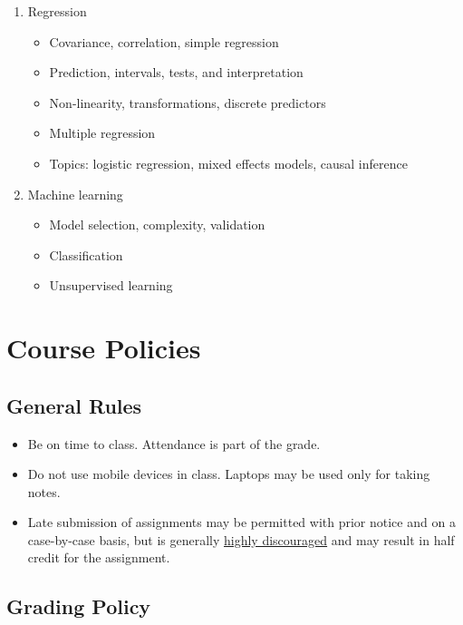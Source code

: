 \documentclass[11pt]{article}
\begin{document}
\begin{enumerate}
\item Regression

  \begin{itemize}
  \item Covariance, correlation, simple regression
  \item Prediction, intervals, tests, and interpretation
  \item Non-linearity, transformations, discrete predictors
  \item Multiple regression
  \item Topics: logistic regression, mixed effects models, causal inference
  \end{itemize}

\item Machine learning

  \begin{itemize}
  \item Model selection, complexity, validation
  \item Classification
  \item Unsupervised learning
  \end{itemize}
  
\end{enumerate}


\section*{Course Policies}

\subsection*{General Rules}

\begin{itemize}
\item Be on time to class. Attendance is part of the grade.
\item Do not use mobile devices in class. Laptops may be used only for taking notes.
\item Late submission of assignments may be permitted with prior notice and on a case-by-case basis, but is generally \underline{highly discouraged} and may result in half credit for the assignment.
\end{itemize}

\subsection*{Grading Policy}
\end{document}

